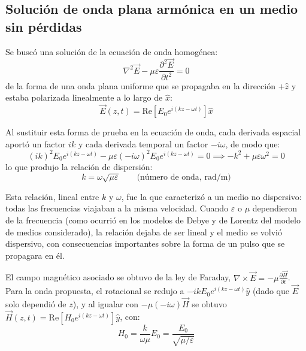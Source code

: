 \subsection{Solución de onda plana armónica en un medio sin pérdidas}
Se buscó una solución de la ecuación de onda homogénea:
\begin{equation}
    \nabla^2\vec{E} - \mu\varepsilon\frac{\partial^2\vec{E}}{\partial t^2} = 0
\end{equation}
de la forma de una onda plana uniforme que se propagaba en la dirección $+\hat{z}$ y estaba polarizada linealmente a lo largo de $\hat{x}$:
\begin{equation}
    \vec{E}(z, t) = \text{Re}\left[E_0 e^{i(kz-\omega t)}\right]\hat{x}
\end{equation}

Al sustituir esta forma de prueba en la ecuación de onda, cada derivada espacial aportó un factor $ik$ y cada derivada temporal un factor $-i\omega$, de modo que:
\begin{equation}
    (ik)^2 E_0 e^{i(kz-\omega t)} - \mu\varepsilon(-i\omega)^2 E_0 e^{i(kz-\omega t)} = 0 \implies -k^2 + \mu\varepsilon\omega^2 = 0
\end{equation}
lo que produjo la relación de dispersión:
\begin{equation}
    k = \omega\sqrt{\mu\varepsilon} \qquad \text{(número de onda, rad/m)}
\end{equation}

Esta relación, lineal entre $k$ y $\omega$, fue la que caracterizó a un medio no dispersivo: todas las frecuencias viajaban a la misma velocidad. Cuando $\varepsilon$ o $\mu$ dependieron de la frecuencia (como ocurrió en los modelos de Debye y de Lorentz del modelo de medios considerado), la relación dejaba de ser lineal y el medio se volvió dispersivo, con consecuencias importantes sobre la forma de un pulso que se propagara en él.

El campo magnético asociado se obtuvo de la ley de Faraday, $\nabla\times\vec{E} = -\mu \frac{\partial\vec{H}}{\partial t}$. Para la onda propuesta, el rotacional se redujo a $-ikE_0 e^{i(kz-\omega t)}\hat{y}$ (dado que $\vec{E}$ solo dependió de $z$), y al igualar con $-\mu(-i\omega)\vec{H}$ se obtuvo $\vec{H}(z, t) = \text{Re}\left[H_0 e^{i(kz-\omega t)}\right]\hat{y}$, con:
\begin{equation}
    H_0 = \frac{k}{\omega\mu}E_0 = \frac{E_0}{\sqrt{\mu/\varepsilon}}
\end{equation}


